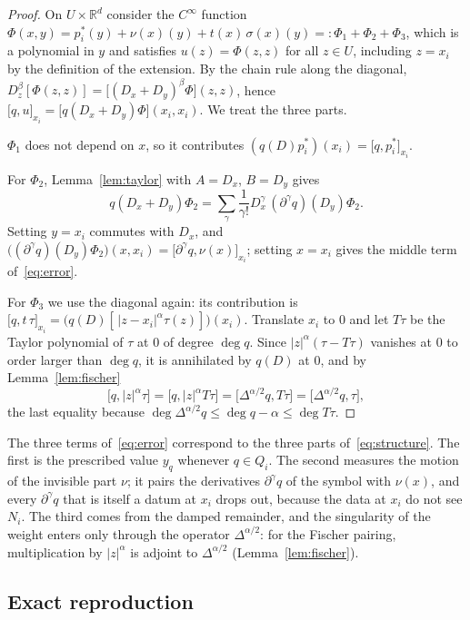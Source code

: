 \documentclass[12pt]{amsart}
\theoremstyle{definition}
\theoremstyle{remark}
\newcommand{\R}{\mathbb{R}}
\newcommand{\fp}[2]{\bigl[#1,#2\bigr]}          %
\newcommand{\fpz}[3]{\bigl[#1,#2\bigr]_{#3}}     %
\begin{document}
\begin{proof}
On $U\times\R^d$ consider the $C^\infty$ function
$\Phi(x,y)=p_i^*(y)+\nu(x)(y)+t(x)\,\sigma(x)(y)=:\Phi_1+\Phi_2+\Phi_3$, which is a
polynomial in $y$ and satisfies $u(z)=\Phi(z,z)$ for all $z\in U$, including $z=x_i$ by the
definition of the extension. By the chain rule along the diagonal,
$D_z^\beta[\Phi(z,z)]=\bigl[(D_x+D_y)^\beta\Phi\bigr](z,z)$, hence
$\fpz{q}{u}{x_i}=\bigl[q(D_x+D_y)\Phi\bigr](x_i,x_i)$. We treat the three parts.

$\Phi_1$ does not depend on $x$, so it contributes $(q(D)p_i^*)(x_i)=\fpz{q}{p_i^*}{x_i}$.

For $\Phi_2$, Lemma~\ref{lem:taylor} with $A=D_x$, $B=D_y$ gives
\[
  q(D_x+D_y)\Phi_2=\sum_\gamma\frac{1}{\gamma!}D_x^\gamma\,(\partial^\gamma q)(D_y)\Phi_2 .
\]
Setting $y=x_i$ commutes with $D_x$, and
$\bigl((\partial^\gamma q)(D_y)\Phi_2\bigr)(x,x_i)=\fpz{\partial^\gamma q}{\nu(x)}{x_i}$; setting $x=x_i$ gives the middle term
of~\eqref{eq:error}.

For $\Phi_3$ we use the diagonal again: its contribution is
$\fpz{q}{t\,\tau}{x_i}=\bigl(q(D)[\,|z-x_i|^\alpha\tau(z)]\bigr)(x_i)$. Translate $x_i$ to $0$
and let $T\tau$ be the Taylor polynomial of $\tau$ at $0$ of degree $\deg q$. Since
$|z|^\alpha(\tau-T\tau)$ vanishes at $0$ to order larger than $\deg q$, it is annihilated by
$q(D)$ at $0$, and by Lemma~\ref{lem:fischer}
\[
  \fp{q}{|z|^\alpha\tau}=\fp{q}{|z|^\alpha T\tau}=\fp{\Delta^{\alpha/2}q}{T\tau}
  =\fp{\Delta^{\alpha/2}q}{\tau},
\]
the last equality because $\deg\Delta^{\alpha/2}q\le\deg q-\alpha\le\deg T\tau$.
\end{proof}

The three terms of~\eqref{eq:error} correspond to the three parts of~\eqref{eq:structure}. The
first is the prescribed value $y_q$ whenever $q\in Q_i$. The second measures the motion of the
invisible part $\nu$; it pairs the derivatives $\partial^\gamma q$ of the symbol with $\nu(x)$,
and every $\partial^\gamma q$ that is itself a datum at $x_i$ drops out, because the data at
$x_i$ do not see $N_i$. The third comes from the damped remainder, and the singularity of the
weight enters only through the operator $\Delta^{\alpha/2}$: for the Fischer pairing,
multiplication by $|z|^\alpha$ is adjoint to $\Delta^{\alpha/2}$ (Lemma~\ref{lem:fischer}).

\subsection{Exact reproduction}\label{sec:exact}
\end{document}
